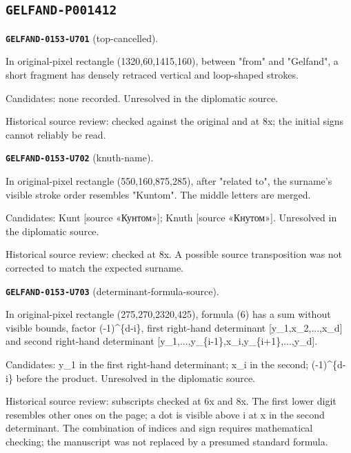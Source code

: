 \subsection*{\texttt{GELFAND-P001412}}
\par\noindent\leavevmode{}\label{GELFAND-0153-U701}\textbf{\texttt{GELFAND-0153-U701}} (top-cancelled).\nopagebreak[4]\par
In original-pixel rectangle (1320,60,1415,160), between "from" and "Gelfand", a short fragment has densely retraced vertical and loop-shaped strokes.\par
Candidates: none recorded. Unresolved in the diplomatic source.\par
Historical source review: checked against the original and at 8x; the initial signs cannot reliably be read.\par\medskip
\par\noindent\leavevmode{}\label{GELFAND-0153-U702}\textbf{\texttt{GELFAND-0153-U702}} (knuth-name).\nopagebreak[4]\par
In original-pixel rectangle (550,160,875,285), after "related to", the surname's visible stroke order resembles "Kuntom". The middle letters are merged.\par
Candidates: Kunt [source «Кунтом»]; Knuth [source «Кнутом»]. Unresolved in the diplomatic source.\par
Historical source review: checked at 8x. A possible source transposition was not corrected to match the expected surname.\par\medskip
\par\noindent\leavevmode{}\label{GELFAND-0153-U703}\textbf{\texttt{GELFAND-0153-U703}} (determinant-formula-source).\nopagebreak[4]\par
In original-pixel rectangle (275,270,2320,425), formula (6) has a sum without visible bounds, factor (-1)\textasciicircum{}\{d-i\}, first right-hand determinant [y\_1,x\_2,...,x\_d] and second right-hand determinant [y\_1,...,y\_\{i-1\},x\_i,y\_\{i+1\},...,y\_d].\par
Candidates: y\_1 in the first right-hand determinant; x\_i in the second; (-1)\textasciicircum{}\{d-i\} before the product. Unresolved in the diplomatic source.\par
Historical source review: subscripts checked at 6x and 8x. The first lower digit resembles other ones on the page; a dot is visible above i at x in the second determinant. The combination of indices and sign requires mathematical checking; the manuscript was not replaced by a presumed standard formula.\par\medskip
